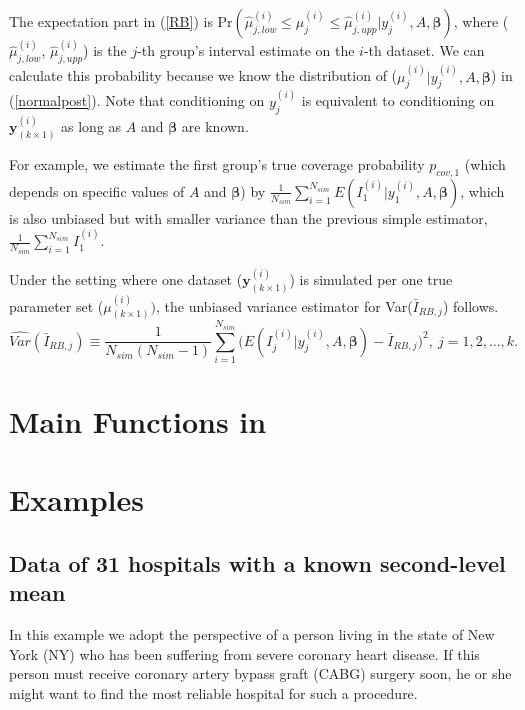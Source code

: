 \documentclass[article]{jss}
\begin{document}
The expectation part in (\ref{RB}) is Pr$(\hat{\mu}^{(i)}_{j, low}\le \mu^{(i)}_{j} \le\hat{\mu}^{(i)}_{j, upp}\vert y^{(i)}_{j}, A, \boldsymbol{\beta})$, where ($\hat{\mu}^{(i)}_{j, low}$, $\hat{\mu}^{(i)}_{j, upp}$) is the $j$-th group's interval estimate on the $i$-th dataset. We can calculate this probability  because we know the distribution of ($\mu^{(i)}_{j} \vert y^{(i)}_{j}, A, \boldsymbol{\beta}$) in (\ref{normalpost}). Note that conditioning on $y^{(i)}_{j}$ is equivalent to conditioning on $\boldsymbol{y}^{(i)}_{(k\times1)}$ as long as $A$ and $\boldsymbol{\beta}$ are known. 

For example, we estimate the first group's true coverage probability $p_{cov, 1}$ (which depends on specific values of $A$ and $\boldsymbol{\beta}$) by $\frac{1}{N_{sim}}\sum_{i=1}^{N_{sim}}E(I^{(i)}_{1}\vert y^{(i)}_{1}, A, \boldsymbol{\beta})$, which is also unbiased but with smaller variance than the previous simple estimator, $\frac{1}{N_{sim}}\sum_{i=1}^{N_{sim}}I^{(i)}_{1}$.

Under the setting where one dataset ($\boldsymbol{y}^{(i)}_{(k\times1)}$) is simulated per one true parameter set ({\boldmath $\mu$}$^{(i)}_{(k\times1)})$, the unbiased variance estimator for Var($\bar{I}_{RB, j}$) follows.
\begin{equation}\label{RBvar}
\widehat{Var}(\bar{I}_{RB, j})\equiv\frac{1}{N_{sim}(N_{sim}-1)}\sum_{i=1}^{N_{sim}}\bigg(E(I^{(i)}_{j}\vert y^{(i)}_{j}, A, \boldsymbol{\beta})-\bar{I}_{RB, j}\bigg)^{2},~ j=1, 2, \ldots, k.
\end{equation}


\section[packageoverview]{Main Functions in }\label{sec5}

\section[Examples]{Examples}\label{sec6}
\subsection[Known Second-level Mean]{Data of 31 hospitals with a known second-level mean}
\label{sec:ex:hosp}
In this example we adopt the perspective of a person living in the state of New York (NY) who has been suffering from severe coronary heart disease. If this person must receive coronary artery bypass graft (CABG) surgery soon, he or she might want to find the most reliable hospital for such a procedure.
\end{document}
